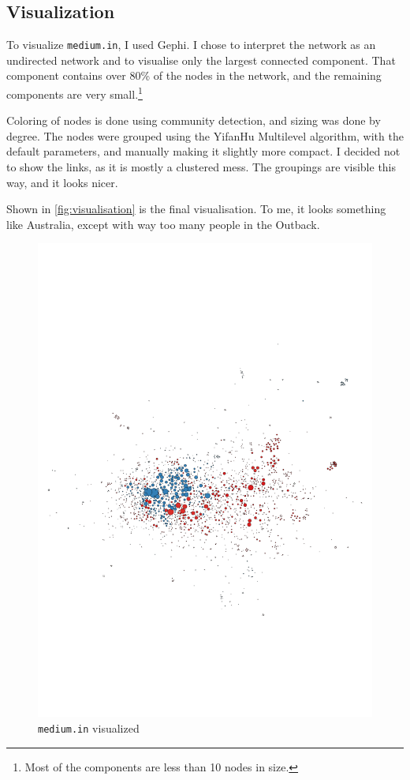 \documentclass[12pt,a4paper,hidelinks]{article}
\begin{document}
\subsection{Visualization}

To visualize \texttt{medium.in}, I used Gephi. I chose to interpret the network as an undirected network and to visualise only the largest connected component. That component contains over 80\% of the nodes in the network, and the remaining components are very small.\footnote{Most of the components are less than 10 nodes in size.}

Coloring of nodes is done using community detection, and sizing was done by degree. The nodes were grouped using the YifanHu Multilevel algorithm, with the default parameters, and manually making it slightly more compact. I decided not to show the links, as it is mostly a clustered mess. The groupings are visible this way, and it looks nicer.

Shown in \autoref{fig:visualisation} is the final visualisation. To me, it looks something like Australia, except with way too many people in the Outback.

\begin{figure}
	\centering
	\includegraphics[scale=0.55]{visualisation}
	\caption{\texttt{medium.in} visualized}
	\label{fig:visualisation}
\end{figure}
\end{document}
